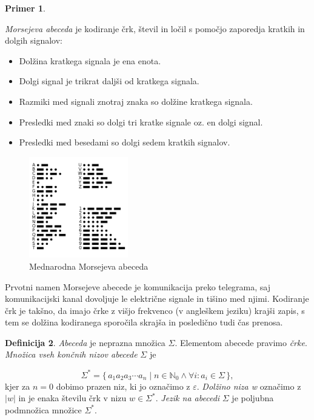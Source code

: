 \documentclass{amsart}
\newcommand{\N}{\mathbb{N}}
\theoremstyle{definition} %
\newtheorem{definicija}{Definicija}[section]
\newtheorem{primer}[definicija]{Primer}
\theoremstyle{plain} %
\begin{document}
\begin{primer}\label{Morse}

    \textit{Morsejeva abeceda} je kodiranje črk, števil in ločil s pomočjo zaporedja kratkih
    in dolgih signalov:

    \begin{itemize}
        \item Dolžina kratkega signala je ena enota.
        \item Dolgi signal je trikrat daljši od kratkega signala.
        \item Razmiki med signali znotraj znaka so dolžine kratkega signala.
        \item Presledki med znaki so dolgi tri kratke signale oz. en dolgi signal.
        \item Presledki med besedami so dolgi sedem kratkih signalov.
    \end{itemize}

    \begin{figure}[h]
        \centering
        \includegraphics[width=4.3cm]{International_Morse_Code.svg.png}
        \caption{Mednarodna Morsejeva abeceda}
        \label{fig:Morse}
    \end{figure}

    Prvotni namen Morsejeve abecede je komunikacija preko telegrama, saj komunikacijski
    kanal dovoljuje le električne signale in tišino med njimi. Kodiranje črk je takšno,
    da imajo črke z višjo frekvenco (v angleškem jeziku) krajši zapis, s tem se dolžina
    kodiranega sporočila skrajša in posledično tudi čas prenosa.

\end{primer}

\begin{definicija}

    \textit{Abeceda} je neprazna množica $ \Sigma $. Elementom abecede pravimo \textit{črke}.
    \textit{Množica vseh končnih nizov abecede} $ \Sigma $ je

    \[
        \Sigma^* = \{\, a_1 a_2 a_3 \cdots a_n \mid n \in \N_0 \land \forall i: a_i \in \Sigma \,\}, 
    \]
    kjer za $ n = 0 $ dobimo prazen niz, ki jo označimo z $ \varepsilon $.
    \textit{Dolžino niza w} označimo z $ |w| $ in je enaka številu črk v nizu $ w \in \Sigma^* $.
    \textit{Jezik na abecedi} $ \Sigma $ je poljubna podmnožica množice $ \Sigma^* $. 

\end{definicija}
\end{document}
